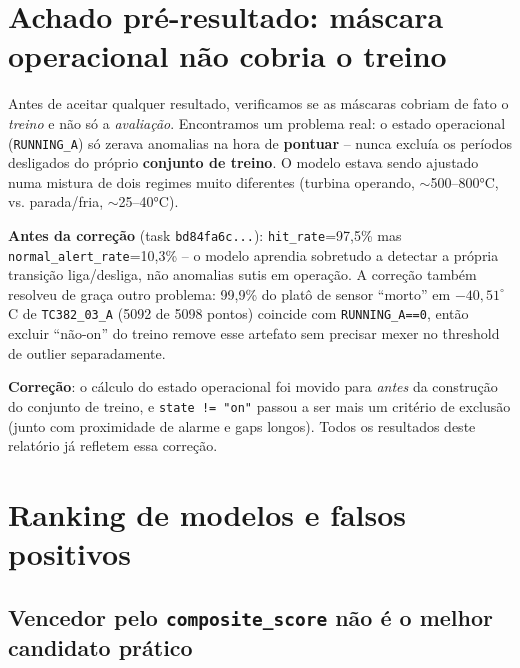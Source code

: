 \documentclass[11pt,a4paper]{article}
\begin{document}
\section{Achado pré-resultado: máscara operacional não cobria o treino}
\label{sec:bug}

Antes de aceitar qualquer resultado, verificamos se as máscaras cobriam de
fato o \emph{treino} e não só a \emph{avaliação}. Encontramos um problema
real: o estado operacional (\texttt{RUNNING\_A}) só zerava anomalias na
hora de \textbf{pontuar} -- nunca excluía os períodos desligados do próprio
\textbf{conjunto de treino}. O modelo estava sendo ajustado numa mistura de
dois regimes muito diferentes (turbina operando, $\sim$500--800°C, vs.
parada/fria, $\sim$25--40°C).

\textbf{Antes da correção} (task \texttt{bd84fa6c...}):
\texttt{hit\_rate}=97,5\% mas \texttt{normal\_alert\_rate}=10,3\% -- o
modelo aprendia sobretudo a detectar a própria transição liga/desliga, não
anomalias sutis em operação. A correção também resolveu de graça outro
problema: 99,9\% do platô de sensor ``morto'' em $-40{,}51^{\circ}$C de
\texttt{TC382\_03\_A} (5092 de 5098 pontos) coincide com
\texttt{RUNNING\_A==0}, então excluir ``não-on'' do treino remove esse
artefato sem precisar mexer no threshold de outlier separadamente.

\textbf{Correção}: o cálculo do estado operacional foi movido para
\emph{antes} da construção do conjunto de treino, e \texttt{state != "on"}
passou a ser mais um critério de exclusão (junto com proximidade de alarme
e gaps longos). Todos os resultados deste relatório já refletem essa
correção.

\section{Ranking de modelos e falsos positivos}
\label{sec:ranking}

\subsection{Vencedor pelo \texttt{composite\_score} não é o melhor candidato prático}
\end{document}
